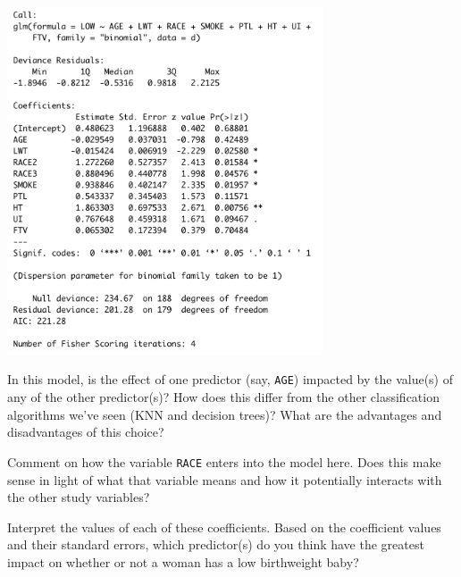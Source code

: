 \begin{center}
\includegraphics[width=0.7\textwidth]{img/logreg-low-bwt-example-model.png}
\end{center}

\begin{question}{}
In this model, is the effect of one predictor (say, \verb|AGE|) impacted by the value(s) of any of the other predictor(s)? How does this differ from the other classification algorithms we've seen (KNN and decision trees)? What are the advantages and disadvantages of this choice? 
\end{question}

\begin{question}{}
Comment on how the variable \texttt{RACE} enters into the model here. Does this make sense in light of what that variable means and how it potentially interacts with the other study variables?
\end{question}

\begin{question}{}
Interpret the values of each of these coefficients. Based on the coefficient values and their standard errors, which predictor(s) do you think have the greatest impact on whether or not a woman has a low birthweight baby? 
\end{question}
